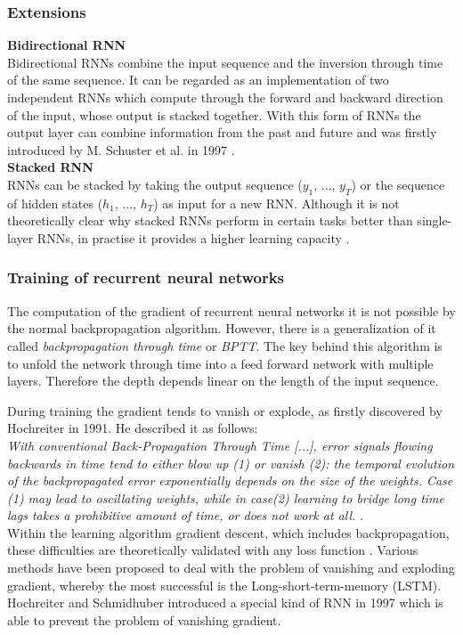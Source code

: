 \subsubsection{Extensions}

\textbf{Bidirectional RNN}\\
Bidirectional RNNs combine the input sequence and the inversion through time of the same sequence. It can be regarded as an implementation of two independent RNNs which compute through the forward and backward direction of the input, whose output is stacked together. With this form of RNNs the output layer can combine information from the past and future and was firstly introduced by M. Schuster et al. in 1997 \cite{schuster_bidirectional_1997}.\\[1em]
\textbf{Stacked RNN}\\
RNNs can be stacked by taking the output sequence ($y_1$, ..., $y_T$) or the sequence of hidden states ($h_1$, ..., $h_T$) as input for a new RNN. Although it is not theoretically clear why stacked RNNs perform in certain tasks better than single-layer RNNs, in practise it provides a higher learning capacity \cite[p.51]{goldberg_primer_2015}.

\subsubsection{Training of recurrent neural networks}
The computation of the gradient of recurrent neural networks it is not possible by the normal backpropagation algorithm. However, there is a generalization of it called \textit{backpropagation through time} or \textit{BPTT}. The key behind this algorithm is to unfold the network through time into a feed forward network with multiple layers. Therefore the depth depends linear on the length of the input sequence. 

During training the gradient tends to vanish or explode, as firstly discovered by Hochreiter in 1991. He described it as follows:\\ \textit{With conventional \glqq Back-Propagation Through Time\grqq{} [...], error signals \glqq flowing backwards in time\grqq{} tend to either blow up (1) or vanish (2): the temporal evolution of the backpropagated error exponentially depends on the size of the weights. Case (1) may lead to oscillating weights, while in case(2) learning to bridge long time lags takes a prohibitive amount of time, or does not work at all.} \cite{kolen_gradient_2009}.\\
Within the learning algorithm gradient descent, which includes backpropagation, these difficulties are theoretically validated with any loss function \cite{bengio_learning_1994}. Various methods have been proposed to deal with the problem of vanishing and exploding gradient, whereby the most successful is the Long-short-term-memory (LSTM). Hochreiter and Schmidhuber introduced a special kind of RNN in 1997 which is able to prevent the problem of vanishing gradient.

